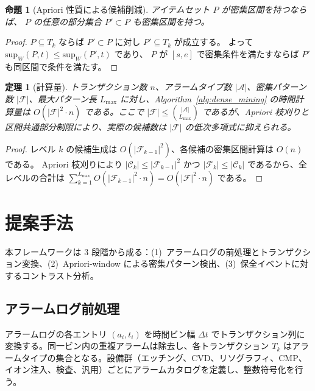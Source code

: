 \documentclass[11pt]{article}
\newtheorem{proposition}{命題}
\newtheorem{theorem}{定理}
\begin{document}
\begin{proposition}[Apriori 性質による候補削減]
\label{prop:apriori}
アイテムセット $P$ が密集区間を持つならば、
$P$ の任意の部分集合 $P' \subset P$ も密集区間を持つ。
\end{proposition}

\begin{proof}
$P \subseteq T_k$ ならば $P' \subset P$ に対し $P' \subseteq T_k$ が成立する。
よって $\mathrm{sup}_W(P, t) \leq \mathrm{sup}_W(P', t)$ であり、
$P$ が $[s,e]$ で密集条件を満たすならば $P'$ も同区間で条件を満たす。
\end{proof}

\begin{theorem}[計算量]
\label{thm:complexity}
トランザクション数 $n$、アラームタイプ数 $|\mathcal{A}|$、密集パターン数 $|\mathcal{F}|$、最大パターン長 $L_{\max}$ に対し、Algorithm~\ref{alg:dense_mining} の時間計算量は $O(|\mathcal{F}|^2 \cdot n)$ である。ここで $|\mathcal{F}| \leq \binom{|\mathcal{A}|}{L_{\max}}$ であるが、Apriori 枝刈りと区間共通部分制限により、実際の候補数は $|\mathcal{F}|$ の低次多項式に抑えられる。
\end{theorem}

\begin{proof}
レベル $k$ の候補生成は $O(|\mathcal{F}_{k-1}|^2)$、各候補の密集区間計算は $O(n)$ である。
Apriori 枝刈りにより $|\mathcal{C}_k| \leq |\mathcal{F}_{k-1}|^2$ かつ $|\mathcal{F}_k| \leq |\mathcal{C}_k|$ であるから、全レベルの合計は $\sum_{k=1}^{L_{\max}} O(|\mathcal{F}_{k-1}|^2 \cdot n) = O(|\mathcal{F}|^2 \cdot n)$ である。
\end{proof}

\section{提案手法}\label{sec:method}

本フレームワークは 3 段階から成る：(1)~アラームログの前処理とトランザクション変換、(2)~Apriori-window による密集パターン検出、(3)~保全イベントに対するコントラスト分析。

\subsection{アラームログ前処理}

アラームログの各エントリ $(a_i, t_i)$ を時間ビン幅 $\Delta t$ でトランザクション列に変換する。同一ビン内の重複アラームは除去し、各トランザクション $T_k$ はアラームタイプの集合となる。設備群（エッチング、CVD、リソグラフィ、CMP、イオン注入、検査、汎用）ごとにアラームカタログを定義し、整数符号化を行う。
\end{document}
